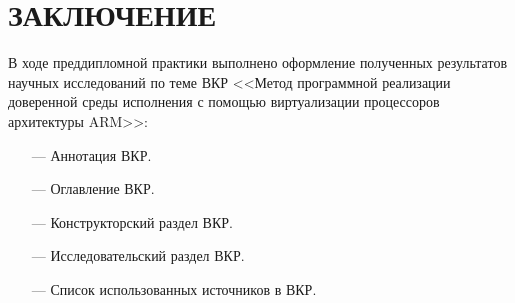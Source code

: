 \section*{ЗАКЛЮЧЕНИЕ}

В ходе преддипломной практики выполнено оформление полученных результатов научных исследований по теме ВКР <<Метод программной реализации доверенной среды исполнения с помощью виртуализации процессоров архитектуры ARM>>:

\begin{itemize}
	\item [---] Аннотация ВКР.
	\item [---] Оглавление ВКР.
	\item [---] Конструкторский раздел ВКР.
	\item [---] Исследовательский раздел ВКР.
	\item [---] Список использованных источников в ВКР.
\end{itemize}

\pagebreak